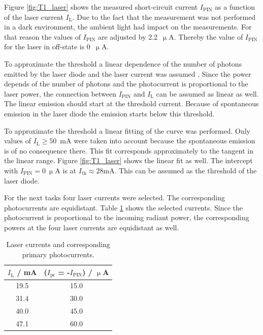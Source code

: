 Figure \ref{fig:T1_laser} shows the measured short-circuit current $I_{\mathrm{PIN}}$ as a function of the laser current $I_{\mathrm{L}}$. Due to the fact that the measurement was not performed in a dark environment, the ambient light had impact on the measurements. For that reason the values of $I_{\mathrm{PIN}}$ are adjusted by 2.2~$\upmu$A. Thereby the value of $I_{\mathrm{PIN}}$ for the laser in off-state is 0~$\upmu$A.

To approximate the threshold a linear dependence of the number of photons emitted by the laser diode and the laser current was assumed \footnotemark[1]. Since the power depends of the number of photons and the photocurrent is proportional to the laser power, the connection between $I_{\mathrm{PIN}}$ and $I_{\mathrm{L}}$ can be assumed as linear as well. The linear emission should start at the threshold current. Because of spontaneous emission in the laser diode the emission starts below this threshold.

To approximate the threshold a linear fitting of the curve was performed. Only values of $I_{\mathrm{L}} \geq 50$~mA were taken into account because the spontaneous emission is of no consequence there. This fit corresponds approximately to the tangent in the linear range. Figure \ref{fig:T1_laser} shows the linear fit as well. The intercept with $I_{\mathrm{PIN}} = 0~\upmu$A is at $I_{\mathrm{th}} \approx 28$mA. This can be assumed as the threshold of the laser diode.

For the next tasks four laser currents were selected. The corresponding photocurrents are equidistant. Table \ref{tab:T1_values} shows the selected currents. Since the photocurrent is proportional to the incoming radiant power, the corresponding powers at the four laser currents are equidistant as well.


\begin{table}%
\centering
\caption{Laser currents and corresponding primary photocurrents.}

\begin{tabular}{cc}

\toprule
$I_{\mathrm{L}}$ / mA	&	($I_{\mathrm{pr}}$ = -$I_{\mathrm{PIN}}$) / $\upmu$A\\

\midrule

19.5&15.0\\
31.4&30.0\\
40.0&45.0\\
47.1&60.0\\
\bottomrule 
\end{tabular}
\label{tab:T1_values}
\end{table}

